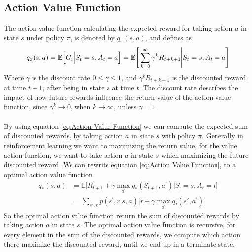 \documentclass[11pt]{article}
\begin{document}
\maketitle

\subsection{Action Value Function}

The action value function calculating the expected reward for taking action $a$ in state $s$ under policy $\pi$, is denoted by $q_{\pi}(s, a)$, and defines as
\\
\begin{equation} \label{eq:Action Value Function}
    q_{\pi}(s, a) = \mathbb{E}\Big[G_{t} \Big| S_{t} = s, A_{t} = a\Big] \\
    = \mathbb{E}\Bigg[\sum_{k = 0}^{\infty}\gamma^{k}R_{t + k + 1} \Bigg| S_{t} = s, A_{t} = a \Bigg]
\end{equation}
Where $\gamma$ is the discount rate $0 \leq \gamma \leq 1$, and
$\gamma^{k}R_{t + k + 1}$ is the discounted reward at time $t + 1$,
after being in state $s$ at time $t$. The discount rate describes the impact of how future rewards influence the return value of the action value function, since $\gamma^{k} \rightarrow 0$, when $k \rightarrow \infty$, unless $\gamma = 1$
\\ \\
By using equation \ref{eq:Action Value Function} we can compute the expected sum of discounted rewards, by taking action $a$ in state $s$ with policy $\pi$. Generally in reinforcement learning we want to maximizing the return value, for the value action function, we want to take action $a$ in state $s$ which maximizing the future discounted reward. We can rewrite equation \ref{eq:Action Value Function}, to a optimal action value function
\begin{equation}
\begin{split}
    q_{*}(s,a) &= \mathbb{E}\Bigg[R_{t + 1} + \gamma  \max\limits_{a^{'}} q_{*}(S_{t + 1}, a^{'}) \Bigg| S_{t} = s, A_{t} = t \Bigg] \\
    &= \sum_{s{'}, r} p(s^{'}, r \Big| s, a) \Big[r + \gamma \max\limits_{a^{'}}q_{*}(s{'}, a^{'})\Big]
\end{split}
\end{equation}
So the optimal action value function return the sum of discounted rewards by taking action $a$ in state $s$. The optimal action value function is recursive, for every element in the sum of the discounted rewards, we compute which action there maximize the discounted reward, until we end up in a terminate state.
\end{document}
